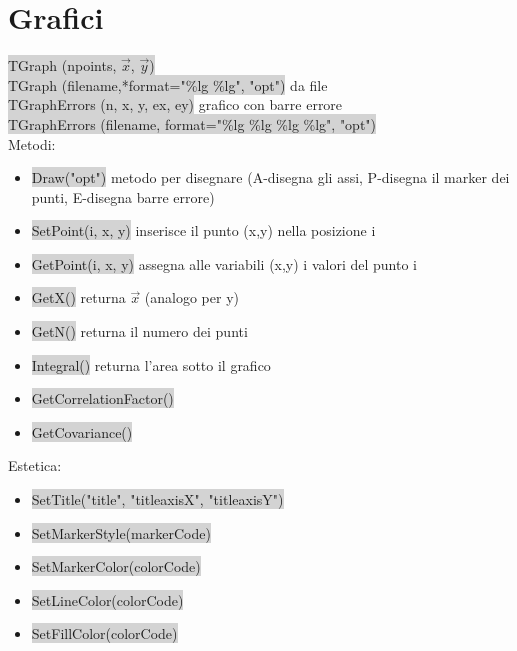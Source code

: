 \documentclass[a4paper]{article}
\begin{document}
\section{Grafici}
    \colorbox{LightGray}{TGraph (npoints, $\vec{x}$, $\vec{y}$)}\\
    \colorbox{LightGray}{TGraph (filename,*format="\%lg \%lg", "opt")} da file\\
    \colorbox{LightGray}{TGraphErrors (n, x, y, ex, ey)} grafico con barre errore\\
    \colorbox{LightGray}{TGraphErrors (filename, format="\%lg \%lg \%lg \%lg", "opt")}\\
    Metodi:
    \begin{itemize}
        \item \colorbox{LightGray}{Draw("opt")} metodo per disegnare (A-disegna gli assi, P-disegna il marker dei punti, E-disegna barre errore)
        \item \colorbox{LightGray}{SetPoint(i, x, y)} inserisce il punto (x,y) nella posizione i
        \item \colorbox{LightGray}{GetPoint(i, x, y)} assegna alle variabili (x,y) i valori del punto i
        \item \colorbox{LightGray}{GetX()} returna $\vec{x}$ (analogo per y)
        \item \colorbox{LightGray}{GetN()} returna il numero dei punti
        \item \colorbox{LightGray}{Integral()} returna l'area sotto il grafico
        \item \colorbox{LightGray}{GetCorrelationFactor()}
        \item \colorbox{LightGray}{GetCovariance()}
    \end{itemize}
    Estetica:
    \begin{itemize}
        \item \colorbox{LightGray}{SetTitle("title", "titleaxisX", "titleaxisY")}
        \item \colorbox{LightGray}{SetMarkerStyle(markerCode)}
        \item \colorbox{LightGray}{SetMarkerColor(colorCode)}
        \item \colorbox{LightGray}{SetLineColor(colorCode)}
        \item \colorbox{LightGray}{SetFillColor(colorCode)}
    \end{itemize}
\end{document}

